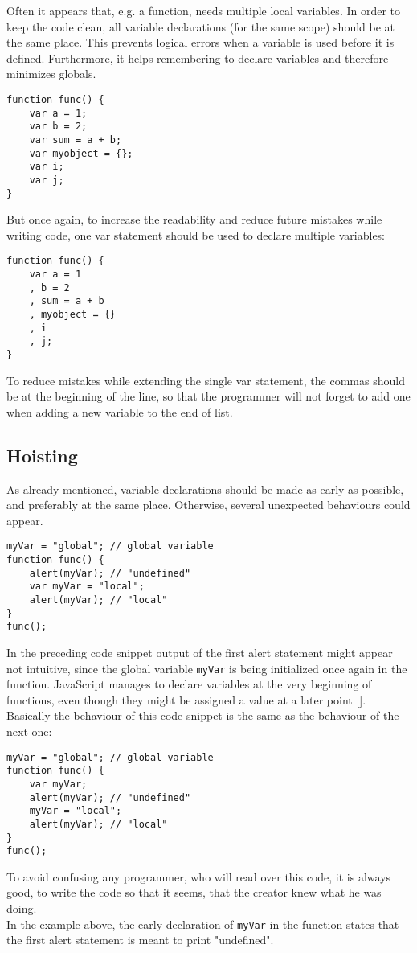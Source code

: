 \documentclass{bioinfo}
\begin{document}
\begin{methods}
Often it appears that, e.g. a function, needs multiple local variables. In order to keep the code clean, all variable declarations (for the same scope) should be at the same place. This prevents logical errors when a variable is used before it is defined. Furthermore, it helps remembering to declare variables and therefore minimizes globals.
\begin{lstlisting}
function func() {
    var a = 1;
    var b = 2;
    var sum = a + b;
    var myobject = {};
    var i;
    var j;
}
\end{lstlisting}
But once again, to increase the readability and reduce future mistakes while writing code, 
one var statement should be used to declare multiple variables:
\begin{lstlisting}
function func() {
    var a = 1
    , b = 2
    , sum = a + b
    , myobject = {}
    , i
    , j;
}
\end{lstlisting}
To reduce mistakes while extending the single var statement, the commas should be at the beginning of the line, so that the programmer will not forget to add one when adding a new variable to the end of list.

\subsection{Hoisting}
As already mentioned, variable declarations should be made as early as possible, and preferably at the same place. Otherwise, several unexpected behaviours could appear.

\begin{lstlisting}
myVar = "global"; // global variable
function func() {
	alert(myVar); // "undefined"
	var myVar = "local";
	alert(myVar); // "local"
}
func();
\end{lstlisting}
In the preceding code snippet output of the first alert statement might appear not intuitive, since the global variable \texttt{myVar} is being initialized once again in the function. JavaScript manages to declare variables at the very beginning of functions, even though they might be assigned a value at a later point [\citealp{stoyan01}].\\
Basically the behaviour of this code snippet is the same as the behaviour of the next one:
\begin{lstlisting}
myVar = "global"; // global variable
function func() {
	var myVar;
	alert(myVar); // "undefined"
	myVar = "local";
	alert(myVar); // "local"
}
func();
\end{lstlisting}
To avoid confusing any programmer, who will read over this code, it is always good, to write the code so that it seems, that the creator knew what he was doing.\\
In the example above, the early declaration of \texttt{myVar} in the function states that the first alert statement is meant to print "undefined".


\end{methods}
\end{document}
